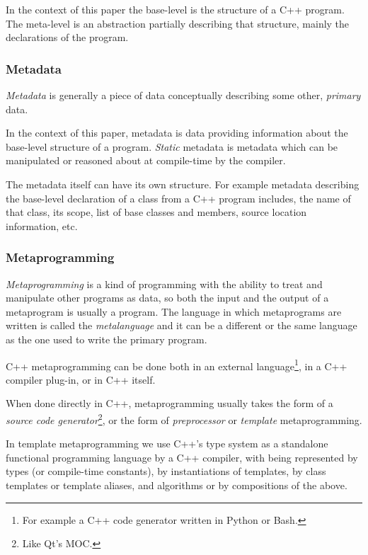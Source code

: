 In the context of this paper the base-level is the structure of a C++ program.
The meta-level is an abstraction partially describing that structure,
mainly the declarations of the program.

\subsubsection{Metadata}
\label{term-metadata}

{\em Metadata} is generally a piece of data conceptually describing some other,
{\em primary} data.

In the context of this paper, metadata is data providing information
about the base-level structure of a program.
{\em Static} metadata is metadata which can be manipulated or reasoned
about at compile-time by the compiler.

The metadata itself can have its own structure.
For example metadata describing the base-level declaration of a class 
from a C++ program includes, the name of that class, its scope, list of base classes
and members, source location information, etc.

\subsubsection{Metaprogramming}

{\em Metaprogramming} is a kind of programming with the ability to treat and
manipulate other programs as data, so both the input and the output of
a metaprogram is usually a program. The language in which metaprograms
are written is called the {\em metalanguage} and it can be a different or the
same language as the one used to write the primary program.

C++ metaprogramming can be done both in an external language\footnote{For example a
C++ code generator written in Python or Bash.}, in a C++ compiler plug-in,
or in C++ itself. 

When done directly in C++, metaprogramming usually takes the form of a
{\em source code generator}\footnote{Like Qt's MOC.}, or the form of {\em preprocessor}
or {\em template} metaprogramming.

In template metaprogramming we use C++'s type system
as a standalone functional programming language  by a C++
compiler, with  being
represented by types (or compile-time constants),
 by instantiations of templates,
 by class templates or template aliases, and
algorithms or  by compositions of the above.

